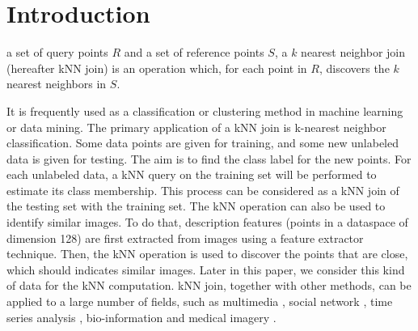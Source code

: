 \documentclass[10pt,journal,compsoc]{IEEEtran}
\begin{document}
\section{Introduction}
 a set of query points $R$ and a set of reference points $S$, a $k$ nearest neighbor join 
(hereafter kNN join) is an operation which, for each point in $R$, discovers 
the $k$ nearest neighbors in $S$. 

It is frequently used as a classification or clustering method in machine learning or data mining. The primary 
application of a kNN join is k-nearest neighbor classification. Some data points are given for training, and some 
new unlabeled data is given for testing. The aim is to find the class label for the new points. For each unlabeled 
data, a kNN query on the training set will be performed to estimate its class membership. This process can be 
considered as a kNN join of the testing set with the training set. The kNN operation can also be used to identify
 similar images. To do that, description features (points in a dataspace of dimension 128) are first extracted from 
 images using a feature extractor technique. Then, the kNN operation is used to discover the points that are close, 
 which should indicates similar images. Later in this paper, we consider this kind of data for the kNN computation. kNN 
 join, together with other methods, can 
be applied to a large number of fields, such as multimedia 
\cite{knn_video_matting_iccv2013,Kriegel:1998:ASS:594718.594761}, social 
network \cite{Bai:2011:CPT:2043652.2043659}, time series analysis 
\cite{Rafiei:1997:SQT:253262.253264,Agrawal:1993:ESS:645415.652239}, bio-information and medical 
imagery \cite{5930107,Korn:1996:FNN:645922.673493}. 
\end{document}
